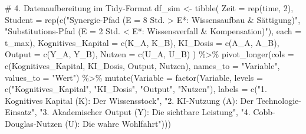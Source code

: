 \documentclass[
  ngerman,
  letterpaper,
  DIV=11]{scrartcl}
\newenvironment{Shaded}{\begin{snugshade}}{\end{snugshade}}
\newcommand{\AttributeTok}[1]{\textcolor[rgb]{0.40,0.45,0.13}{#1}}
\newcommand{\CommentTok}[1]{\textcolor[rgb]{0.37,0.37,0.37}{#1}}
\newcommand{\DecValTok}[1]{\textcolor[rgb]{0.68,0.00,0.00}{#1}}
\newcommand{\FunctionTok}[1]{\textcolor[rgb]{0.28,0.35,0.67}{#1}}
\newcommand{\NormalTok}[1]{\textcolor[rgb]{0.00,0.23,0.31}{#1}}
\newcommand{\OtherTok}[1]{\textcolor[rgb]{0.00,0.23,0.31}{#1}}
\newcommand{\SpecialCharTok}[1]{\textcolor[rgb]{0.37,0.37,0.37}{#1}}
\newcommand{\StringTok}[1]{\textcolor[rgb]{0.13,0.47,0.30}{#1}}
\begin{document}
\begin{Shaded}
\begin{Highlighting}[]
\CommentTok{\# 4. Datenaufbereitung im Tidy{-}Format}
\NormalTok{df\_sim }\OtherTok{\textless{}{-}} \FunctionTok{tibble}\NormalTok{(}
  \AttributeTok{Zeit =} \FunctionTok{rep}\NormalTok{(time, }\DecValTok{2}\NormalTok{),}
  \AttributeTok{Student =} \FunctionTok{rep}\NormalTok{(}\FunctionTok{c}\NormalTok{(}\StringTok{"Synergie{-}Pfad (E = 8 Std. \textgreater{} E*: Wissensaufbau \& Sättigung)"}\NormalTok{, }
                  \StringTok{"Substitutions{-}Pfad (E = 2 Std. \textless{} E*: Wissensverfall \& Kompensation)"}\NormalTok{), }\AttributeTok{each =}\NormalTok{ t\_max),}
  \AttributeTok{Kognitives\_Kapital =} \FunctionTok{c}\NormalTok{(K\_A, K\_B),}
  \AttributeTok{KI\_Dosis =} \FunctionTok{c}\NormalTok{(A\_A, A\_B),}
  \AttributeTok{Output =} \FunctionTok{c}\NormalTok{(Y\_A, Y\_B),}
  \AttributeTok{Nutzen =} \FunctionTok{c}\NormalTok{(U\_A, U\_B)}
\NormalTok{) }\SpecialCharTok{\%\textgreater{}\%}
  \FunctionTok{pivot\_longer}\NormalTok{(}\AttributeTok{cols =} \FunctionTok{c}\NormalTok{(Kognitives\_Kapital, KI\_Dosis, Output, Nutzen),}
               \AttributeTok{names\_to =} \StringTok{"Variable"}\NormalTok{,}
               \AttributeTok{values\_to =} \StringTok{"Wert"}\NormalTok{) }\SpecialCharTok{\%\textgreater{}\%}
  \FunctionTok{mutate}\NormalTok{(}\AttributeTok{Variable =} \FunctionTok{factor}\NormalTok{(Variable, }
                           \AttributeTok{levels =} \FunctionTok{c}\NormalTok{(}\StringTok{"Kognitives\_Kapital"}\NormalTok{, }\StringTok{"KI\_Dosis"}\NormalTok{, }\StringTok{"Output"}\NormalTok{, }\StringTok{"Nutzen"}\NormalTok{),}
                           \AttributeTok{labels =} \FunctionTok{c}\NormalTok{(}\StringTok{"1. Kognitives Kapital (K): Der Wissensstock"}\NormalTok{, }
                                      \StringTok{"2. KI{-}Nutzung (A): Der Technologie{-}Einsatz"}\NormalTok{, }
                                      \StringTok{"3. Akademischer Output (Y): Die sichtbare Leistung"}\NormalTok{,}
                                      \StringTok{"4. Cobb{-}Douglas{-}Nutzen (U): Die wahre Wohlfahrt"}\NormalTok{)))}


\end{Highlighting}
\end{Shaded}
\end{document}

